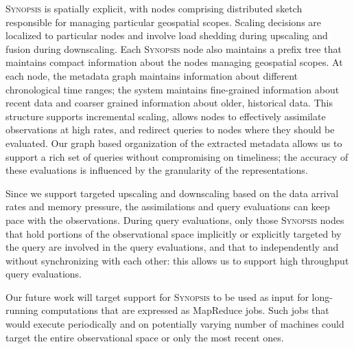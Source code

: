 \begin{description}[leftmargin=*]
\item[RQ-3:] \textsc{Synopsis} is spatially explicit, with nodes comprising distributed sketch responsible for managing particular geospatial scopes. Scaling decisions are localized to particular nodes and involve load shedding during upscaling and fusion during downscaling. Each \textsc{Synopsis} node also maintains a prefix tree that maintains compact information about the nodes managing geospatial scopes. At each node, the metadata graph maintains information about different chronological time ranges; the system maintains fine-grained information about recent data and coarser grained information about older, historical data. This structure supports incremental scaling, allows nodes to effectively assimilate observations at high rates, and redirect queries to nodes where they should be evaluated. Our graph based organization of the extracted metadata allows us to support a rich set of queries without compromising on timeliness; the accuracy of these evaluations is influenced by the granularity of the representations.  

\item[RQ-4:] Since we support targeted upscaling and downscaling based on the data arrival rates and memory pressure, the assimilations and query evaluations can keep pace with the observations. During query evaluations,  only those \textsc{Synopsis} nodes that hold portions of the observational space implicitly or explicitly targeted by the query are involved in the query evaluations, and that to independently and without synchronizing with each other: this allows us to support high throughput query evaluations.

Our future work will target support for \textsc{Synopsis} to be used as input for long-running computations that are expressed as MapReduce jobs. Such jobs that would execute periodically and on potentially varying number of machines could target the entire observational space or only the most recent ones.
\end{description}
